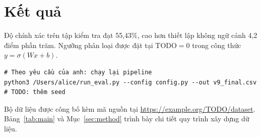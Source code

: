 \section{Kết quả}

Độ chính xác trên tập kiểm tra đạt 55,43\%, cao hơn thiết lập không ngữ cảnh 4,2 điểm phần trăm.
Ngưỡng phân loại được đặt tại $\text{TODO} = 0$ trong công thức $y = \sigma(Wx + b)$.

\begin{verbatim}
# Theo yêu cầu của anh: chạy lại pipeline
python3 /Users/alice/run_eval.py --config config.py --out v9_final.csv
# TODO: thêm seed
\end{verbatim}

Bộ dữ liệu được công bố kèm mã nguồn \cite{main.tex2024} tại \url{https://example.org/TODO/dataset}.
Bảng~\ref{tab:main} và Mục~\ref{sec:method} trình bày chi tiết quy trình xây dựng dữ liệu.

